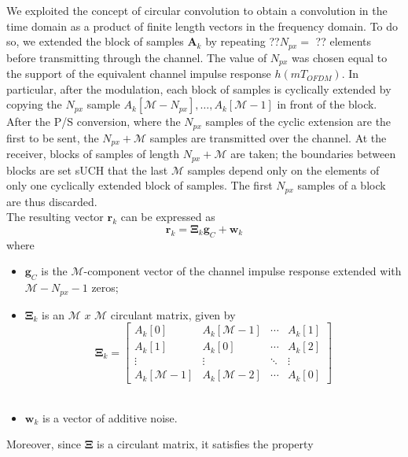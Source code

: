 \documentclass[a4paper, 12pt]{report}
\begin{document}
We exploited the concept of circular convolution to obtain a convolution in the time domain as a product of finite length vectors in the frequency domain. To do so, we extended the block of samples $\mathbf{A}_k$ by repeating ??$N_{px}=$ ?? elements before transmitting through the channel. The value of $N_{px}$ was chosen equal to the support of the equivalent channel impulse response $h(mT_{OFDM})$. In particular, after the modulation, each block of samples is cyclically extended by copying the $N_{px}$ sample $A_k[\mathcal{M}-N_{px}],\dots,A_k[\mathcal{M}-1]$ in front of the block. After the P/S conversion, where the $N_{px}$ samples of the cyclic extension are the first to be sent, the $N_{px}+\mathcal{M}$ samples are transmitted over the channel.  At the receiver, blocks of samples of length $N_{px}+\mathcal{M}$ are taken; the boundaries between blocks are set sUCH that the last $\mathcal{M}$ samples depend only on the elements of only one cyclically extended block of samples. The first $N_{px}$ samples of a block are thus discarded. \\
The resulting vector $\mathbf{r}_k$ can be expressed as 
\begin{equation}
\mathbf{r}_k = \mathbf{\Xi}_k\mathbf{g}_C + \mathbf{w}_k
\end{equation}
where 

\begin{itemize}
	\item $\mathbf{g}_C$ is the $\mathcal{M}$-component vector of the channel impulse response extended with $\mathcal{M}-N_{px}-1$ zeros;
	\item $\mathbf{\Xi}_k$ is an $\mathcal{M}$ $x$ $\mathcal{M}$ circulant matrix, given by
	\begin{equation*}
	\mathbf{\Xi}_k = \begin{bmatrix}
						A_k[0] & A_k[\mathcal{M}-1] & \cdots & A_k[1] \\
						A_k[1] & A_k[0] & \cdots & A_k[2] \\
						\vdots & \vdots & \ddots & \vdots \\
						A_k[\mathcal{M}-1] & A_k[\mathcal{M}-2] & \cdots & A_k[0]
	\end{bmatrix}
	\end{equation*} \\
	
	\item $ \mathbf{w}_k$ is a vector of additive noise. 
\end{itemize}

Moreover, since $\mathbf{\Xi}$ is a circulant matrix, it satisfies the property
\end{document}
